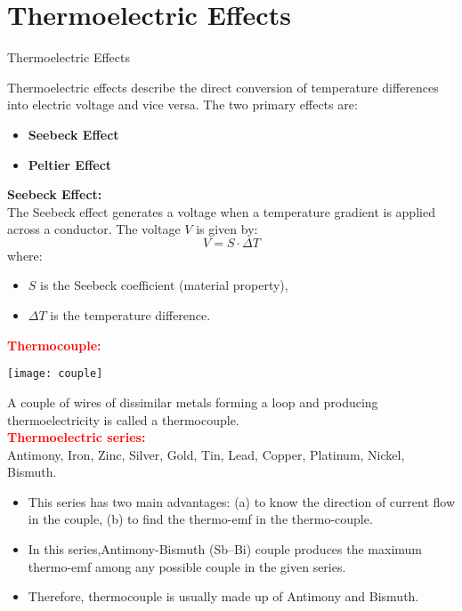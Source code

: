 \documentclass{beamer}
\begin{document}
\section{Thermoelectric Effects}
\begin{frame}{Thermoelectric Effects}
    
Thermoelectric effects describe the direct conversion of temperature differences into electric voltage and vice versa. The two primary effects are:

\begin{itemize}
    \item \textbf{Seebeck Effect}
    \item \textbf{Peltier Effect}
\end{itemize}

\begin{tcolorbox}[colback=blue!10!white, colframe=blue!50!black, title=Mathematical Explanation]
\vspace{0.2cm}

\textbf{Seebeck Effect:} \\
The Seebeck effect generates a voltage when a temperature gradient is applied across a conductor. The voltage \( V \) is given by:
\[
V = S \cdot \Delta T
\]
where:
\begin{itemize}
    \item \( S \) is the Seebeck coefficient (material property),
    \item \( \Delta T \) is the temperature difference.
\end{itemize}
\end{tcolorbox}

\end{frame}

\begin{frame}
\textcolor{red}{\textbf{Thermocouple:}}\\
\begin{center}
\texttt{[image: couple]}
\end{center}
A couple of wires of dissimilar metals forming a loop and
producing thermoelectricity is called a thermocouple.\\
\textcolor{red}{\textbf{Thermoelectric series:}}\\
Antimony, Iron, Zinc, Silver, Gold, Tin, Lead, Copper, Platinum, Nickel, Bismuth.\\
\begin{itemize}
\item This series has two main advantages: (a) to know the direction of current flow in the couple, (b) to find the thermo-emf in the thermo-couple.
\item In this series,Antimony-Bismuth (Sb–Bi) couple produces the maximum thermo-emf among any possible couple in the given series. 
\item Therefore, thermocouple is usually made up of Antimony and Bismuth.

\end{itemize}

\end{frame}
\end{document}
